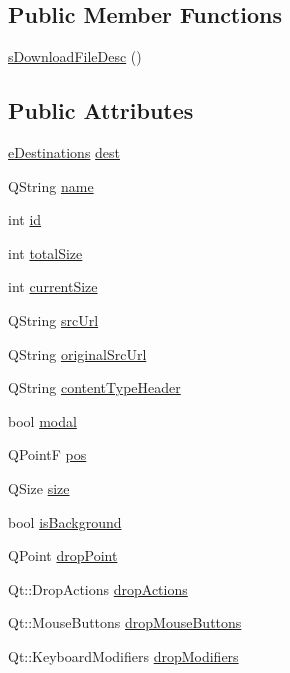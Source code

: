 \subsection*{Public Member Functions}
\begin{DoxyCompactItemize}
\item 
\hyperlink{structs_download_file_desc_aca24b80fe89dc0cdc2f7e0584105f550}{s\-Download\-File\-Desc} ()
\end{DoxyCompactItemize}
\subsection*{Public Attributes}
\begin{DoxyCompactItemize}
\item 
\hyperlink{structs_download_file_desc_ad995f6191451705cb58a55a5dff81967}{e\-Destinations} \hyperlink{structs_download_file_desc_aa28d39c1093b42e10e2c521954178fd3}{dest}
\item 
Q\-String \hyperlink{structs_download_file_desc_a77186047aac4272ab2dbfff324911214}{name}
\item 
int \hyperlink{structs_download_file_desc_a09153ec49d55f18d9ad36aaa57b0e11f}{id}
\item 
int \hyperlink{structs_download_file_desc_a8edfff7d9fc9da8b982caf2bacbb9819}{total\-Size}
\item 
int \hyperlink{structs_download_file_desc_aab346a62032910198e1701d51737d37b}{current\-Size}
\item 
Q\-String \hyperlink{structs_download_file_desc_a4a988f6add910812e0b8a5166ecb39d9}{src\-Url}
\item 
Q\-String \hyperlink{structs_download_file_desc_a1b6e4c982c432d3db9339e2eab20ab81}{original\-Src\-Url}
\item 
Q\-String \hyperlink{structs_download_file_desc_a1c01babcf4424316306f17ed49245aaf}{content\-Type\-Header}
\item 
bool \hyperlink{structs_download_file_desc_abb72982d76747d63dca453ef483b3a3e}{modal}
\item 
Q\-Point\-F \hyperlink{structs_download_file_desc_a187d0504d19892e2d483f47a349b6194}{pos}
\item 
Q\-Size \hyperlink{structs_download_file_desc_aff74b0da56f2a5921847c1ab5c013476}{size}
\item 
bool \hyperlink{structs_download_file_desc_ad945d24ca6d26c992c66e95c0447f165}{is\-Background}
\item 
Q\-Point \hyperlink{structs_download_file_desc_a0344f0e1006956277665248807244798}{drop\-Point}
\item 
Qt\-::\-Drop\-Actions \hyperlink{structs_download_file_desc_ac41e67945d6b6da1762155a155e0d18a}{drop\-Actions}
\item 
Qt\-::\-Mouse\-Buttons \hyperlink{structs_download_file_desc_ae81de2ab2b3e04bf4e04e02a85e0026d}{drop\-Mouse\-Buttons}
\item 
Qt\-::\-Keyboard\-Modifiers \hyperlink{structs_download_file_desc_ac01c63c05c6449d85ab1eb842a3c1804}{drop\-Modifiers}
\end{DoxyCompactItemize}


